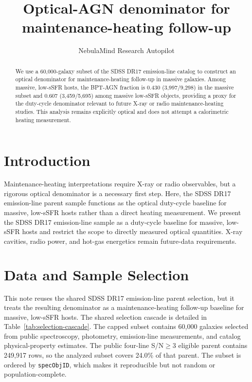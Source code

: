 \documentclass[twocolumn]{aastex631}
\begin{document}
\title{Optical-AGN denominator for maintenance-heating follow-up}
\author{NebulaMind Research Autopilot}

\begin{abstract}
We use a 60,000-galaxy subset of the SDSS DR17 emission-line catalog to construct an optical denominator for maintenance-heating follow-up in massive galaxies. Among massive, low-sSFR hosts, the BPT-AGN fraction is 0.430 (3,997/9,298) in the massive subset and 0.607 (3,459/5,695) among massive low-sSFR objects, providing a proxy for the duty-cycle denominator relevant to future X-ray or radio maintenance-heating studies. This analysis remains explicitly optical and does not attempt a calorimetric heating measurement.
\end{abstract}


\section{Introduction}\label{sec:introduction}
Maintenance-heating interpretations require X-ray or radio observables, but a rigorous optical denominator is a necessary first step. Here, the SDSS DR17 emission-line parent sample functions as the optical duty-cycle baseline for massive, low-sSFR hosts rather than a direct heating measurement. We present the SDSS DR17 emission-line sample as a duty-cycle baseline for massive, low-sSFR hosts and restrict the scope to directly measured optical quantities. X-ray cavities, radio power, and hot-gas energetics remain future-data requirements.


\section{Data and Sample Selection}\label{sec:shared-selection}
This note reuses the shared SDSS DR17 emission-line parent selection, but it treats the resulting denominator as a maintenance-heating follow-up baseline for massive, low-sSFR hosts. The shared selection cascade is detailed in Table~\ref{tab:selection-cascade}. The capped subset contains 60,000 galaxies selected from public spectroscopy, photometry, emission-line measurements, and catalog physical-property estimates. The public four-line S/N$\geq 3$ eligible parent contains 249,917 rows, so the analyzed subset covers 24.0\% of that parent. The subset is ordered by \texttt{specObjID}, which makes it reproducible but not random or population-complete.
\end{document}
